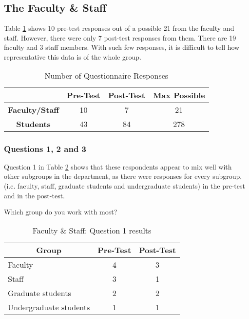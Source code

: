 \subsection{The Faculty \& Staff}

Table \ref{tab:numResponses} shows 10 pre-test responses out of a possible 21
from the faculty and staff.  However, there were only 7 post-test responses
from them.  There are 19 faculty and 3 staff members.  With such few responses,
it is difficult to tell how representative this data is of the whole group.

\begin{table}[ht]
\caption{Number of Questionnaire Responses}
\begin{center}
\begin{tabular}{|c|c|c|c|}\hline
  & {\bf Pre-Test} & {\bf Post-Test} & {\bf Max Possible} \\ \hline 
  {\bf Faculty/Staff} & 10 & 7 & 21 \\ \hline 
  {\bf Students} & 43 & 84 & 278 \\ \hline 
\end{tabular}
\end{center}
\label{tab:numResponses}
\end{table}

\subsubsection{Questions 1, 2 and 3}

Question 1 in Table \ref{tab:question1a} shows that these respondents appear to
mix well with other subgroups in the department, as there were responses for
every subgroup, (i.e. faculty, staff, graduate students and undergraduate
students) in the pre-test and in the post-test.

\begin{table}[htb]
\caption{Faculty \& Staff: Question 1 results}
\begin{center}
{Which group do you work with most?}\\[1ex]
\begin{tabular}{|l|c|c|} \hline
 \multicolumn{1}{|c|}{\bf Group} & 
 \multicolumn{1}{|c|}{\bf Pre-Test} &
 \multicolumn{1}{|c|}{\bf Post-Test} \\ \hline
 Faculty & \multicolumn{1}{|c|}{4} & \multicolumn{1}{|c|}{3} \\ \hline 
 Staff & \multicolumn{1}{|c|}{3} & \multicolumn{1}{|c|}{1} \\ \hline 
 Graduate students & \multicolumn{1}{|c|}{2} & \multicolumn{1}{|c|}{2} \\ \hline 
 Undergraduate students & \multicolumn{1}{|c|}{1} & \multicolumn{1}{|c|}{1} \\ \hline
\end{tabular}
\end{center}
\label{tab:question1a}
\end{table}

